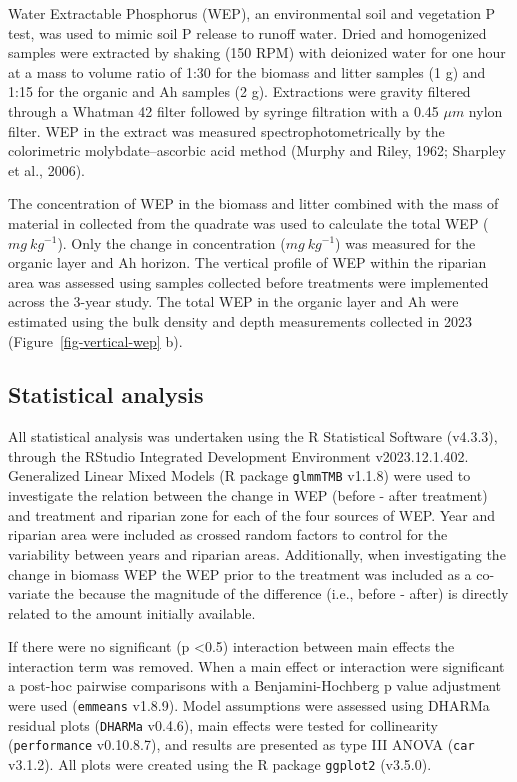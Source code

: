 \documentclass[
]{agujournal2019}
\begin{document}
Water Extractable Phosphorus (WEP), an environmental soil and vegetation
P test, was used to mimic soil P release to runoff water. Dried and
homogenized samples were extracted by shaking (150 RPM) with deionized
water for one hour at a mass to volume ratio of 1:30 for the biomass and
litter samples (1 g) and 1:15 for the organic and Ah samples (2 g).
Extractions were gravity filtered through a Whatman 42 filter followed
by syringe filtration with a 0.45 \(\mu m\) nylon filter. WEP in the
extract was measured spectrophotometrically by the colorimetric
molybdate--ascorbic acid method (Murphy and Riley, 1962; Sharpley et
al., 2006).

The concentration of WEP in the biomass and litter combined with the
mass of material in collected from the quadrate was used to calculate
the total WEP (\(mg~kg^{-1}\)). Only the change in concentration
(\(mg~kg^{-1}\)) was measured for the organic layer and Ah horizon. The
vertical profile of WEP within the riparian area was assessed using
samples collected before treatments were implemented across the 3-year
study. The total WEP in the organic layer and Ah were estimated using
the bulk density and depth measurements collected in 2023
(Figure~\ref{fig-vertical-wep} b).

\subsection{Statistical analysis}\label{statistical-analysis}

All statistical analysis was undertaken using the R Statistical Software
(v4.3.3), through the RStudio Integrated Development Environment
v2023.12.1.402. Generalized Linear Mixed Models (R package
\texttt{glmmTMB} v1.1.8) were used to investigate the relation between
the change in WEP (before - after treatment) and treatment and riparian
zone for each of the four sources of WEP. Year and riparian area were
included as crossed random factors to control for the variability
between years and riparian areas. Additionally, when investigating the
change in biomass WEP the WEP prior to the treatment was included as a
co-variate the because the magnitude of the difference (i.e., before -
after) is directly related to the amount initially available.

If there were no significant (p \textless0.5) interaction between main
effects the interaction term was removed. When a main effect or
interaction were significant a post-hoc pairwise comparisons with a
Benjamini-Hochberg p value adjustment were used (\texttt{emmeans}
v1.8.9). Model assumptions were assessed using DHARMa residual plots
(\texttt{DHARMa} v0.4.6), main effects were tested for collinearity
(\texttt{performance} v0.10.8.7), and results are presented as type III
ANOVA (\texttt{car} v3.1.2). All plots were created using the R package
\texttt{ggplot2} (v3.5.0).
\end{document}
